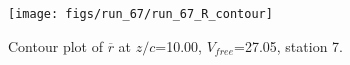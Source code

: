 \begin{figure}[H]
\centering
\texttt{[image: figs/run\_67/run\_67\_R\_contour]}
\caption{Contour plot of $\overline{r}$ at $z/c$=10.00, $V_{free}$=27.05, station 7.}
\label{fig:run_67_R_contour}
\end{figure}


